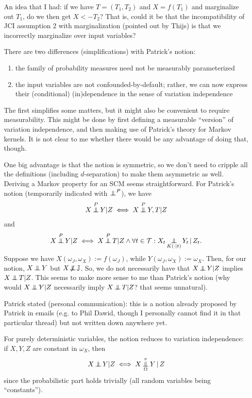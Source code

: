 An idea that I had: if we have $T = (T_1,T_2)$ and $X=f(T_1)$ and marginalize out $T_1$, do we then get $X<-T_2$? That is, could it be that the incompatibility of JCI assumption 2 with marginalization (pointed out by Thijs) is that we incorrectly marginalize over input variables?

There are two differences (simplifications) with Patrick's notion:
\begin{enumerate}
  \item the family of probability measures need not be measurably parameterized
  \item the input variables are not confounded-by-default; rather, we can now express their (conditional) (in)dependence in the sense of variation independence
\end{enumerate}

The first simplifies some matters, but it might also be convenient to require measurability. This might be done by first defining a measurable ``version'' of variation independence, and then making use of Patrick's theory for Markov kernels. It is not clear to me whether there would be any advantage of doing that, though.

One big advantage is that the notion is symmetric, so we don't need to cripple all the definitions (including $d$-separation) to make them asymmetric as well. Deriving a Markov property for an SCM seems straightforward.
For Patrick's notion (temporarily indicated with $\operatorname*{\perp\mkern-11mu\perp}^P$), we have 
$$X \operatorname*{\perp\mkern-11mu\perp}^P Y | Z \iff X \operatorname*{\perp\mkern-11mu\perp}^P Y,T | Z$$
and
$$X \operatorname*{\perp\mkern-11mu\perp}^P Y | Z \iff X \operatorname*{\perp\mkern-11mu\perp}^P T | Z \land \forall t \in \mathcal{T} : X_t \operatorname*{\perp\mkern-11mu\perp}_{K(\cdot|t)} Y_t \operatorname*{|} Z_t.$$
Suppose we have $X(\omega_J,\omega_X) := f(\omega_J)$, while $Y(\omega_J,\omega_X) := \omega_X$.
Then, for our notion, $X \operatorname*{\perp\mkern-11mu\perp} Y$ but $X \operatorname*{\not\mkern-2mu\perp\mkern-11mu\perp} \mathbb{J}$. So, we do not necessarily have that $X \operatorname*{\perp\mkern-11mu\perp} Y | Z$ implies $X  \operatorname*{\perp\mkern-11mu\perp} T | Z$.
This seems to make more sense to me than Patrick's notion (why would $X \operatorname*{\perp\mkern-11mu\perp} Y | Z$ necessarily imply $X \operatorname*{\perp\mkern-11mu\perp} T | Z$? that seems unnatural).

Patrick stated (personal communication): this is a notion already proposed by Patrick in emails (e.g. to Phil Dawid, though I personally cannot find it in that particular thread) but not written down anywhere yet.

For purely deterministic variables, the notion reduces to variation independence:
if $X,Y,Z$ are constant in $\omega_X$, then
$$X \operatorname*{\perp\mkern-11mu\perp} Y | Z \iff X \operatorname*{\perp\mkern-11mu\perp}^v_\Omega Y \operatorname*{|} Z$$
since the probabilistic part holds trivially (all random variables being ``constants'').

